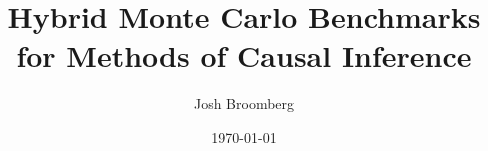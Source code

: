 \documentclass[../main.tex]{subfiles}
\begin{document}
\title{Hybrid Monte Carlo Benchmarks for Methods of Causal Inference}
\author{Josh Broomberg}
\date{\today}
\maketitle
\end{document}
